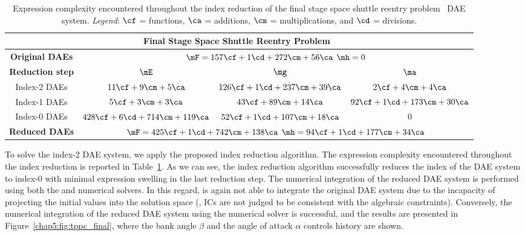 \begin{table}
  \caption{Expression complexity encountered throughout the index reduction of the final stage space shuttle reentry problem~\cite{brenan1995numerical} \ac{DAE} system. \emph{Legend}: $\cf$ = functions, $\ca$ = additions, $\cm$ = multiplications, and $\cd$ = divisions.}
  \label{chap5:tab:tppc_final}
  \centering
  {\footnotesize\begin{tabular}{cccc}
    \multicolumn{4}{c}{\textbf{Final Stage Space Shuttle Reentry Problem~\cite{brenan1995numerical}}} \\
    \toprule
    \textbf{Original \acp{DAE}} & \multicolumn{3}{c}{$\mF = 157\cf + 1\cd + 272\cm + 56\ca$ \quad $\mh = 0$} \\
    \midrule
    \textbf{Reduction step} & $\mE$ & $\mg$ & $\ma$ \\
    \midrule
    Index-2 \acp{DAE} & $11\cf + 9\cm + 5\ca$ & $126\cf + 1\cd + 237\cm + 39\ca$ & $2\cf + 4\cm + 4\ca$ \\
    Index-1 \acp{DAE} & $5\cf + 3\cm + 3\ca$ & $43\cf + 89\cm + 14\ca$ & $92\cf + 1\cd + 173\cm + 30\ca$ \\
    Index-0 \acp{DAE} & $428\cf + 6\cd + 714\cm + 119\ca$ & $52\cf + 1\cd + 107\cm + 18\ca$ & $0$ \\
    \midrule
    \textbf{Reduced \acp{DAE}} & \multicolumn{3}{c}{$\mF = 425\cf + 1\cd + 742\cm + 138\ca$ \quad $\mh = 94\cf + 1\cd + 177\cm + 34\ca$} \\
    \bottomrule
  \end{tabular}}
\end{table}

To solve the index-2 \ac{DAE} system, we apply the proposed index reduction algorithm. The expression complexity encountered throughout the index reduction is reported in Table~\ref{chap5:tab:tppc_final}. As we can see, the index reduction algorithm successfully reduces the index of the \ac{DAE} system to index-0 with minimal expression swelling in the last reduction step. The numerical integration of the reduced \ac{DAE} system is performed using both the \Maple{} and \Indigo{} numerical solvers. In this regard, \Maple{} is again not able to integrate the original \ac{DAE} system due to the incapacity of projecting the initial values into the solution space (\ie{}, \acp{IC} are not judged to be consistent with the algebraic constraints). Conversely, the numerical integration of the reduced \ac{DAE} system using the \Indigo{} numerical solver is successful, and the results are presented in Figure~\ref{chap5:fig:tppc_final}, where the bank angle $\beta$ and the angle of attack $\alpha$ controls history are shown.

